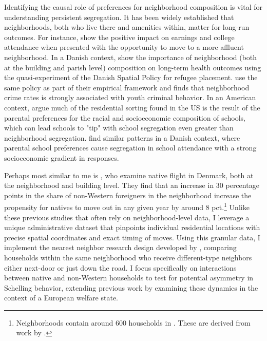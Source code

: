 \documentclass[../main.tex]{subfiles}
\begin{document}
Identifying the causal role of preferences for neighborhood composition is vital for understanding persistent segregation. It has been widely established that neighborhoods, both who live there and amenities within, matter for long-run outcomes. For instance, \textcite{chetty2016effects} show the positive impact on earnings and college attendance when presented with the opportunity to move to a more affluent neighborhood. In a Danish context, \textcite{hasager2024sick_poor_neighborhood} show the importance of neighborhood (both at the building and parish level) composition on long-term health outcomes using the quasi-experiment of the Danish Spatial Policy for refugee placement. \textcite{damm2014crime} use the same policy as part of their empirical framework and finds that neighborhood crime rates is strongly associated with youth criminal behavior. In an American context, \textcite{caetano2017school} argue much of the residential sorting found in the US is the result of the parental preferences for the racial and socioeconomic composition of schools, which can lead schools to "tip" with school segregation even greater than neighborhood segregation. \textcite{andreas_gandil_2024attendance_school_segregation} find similar patterns in a Danish context, where parental school preferences cause segregation in school attendance with a strong socioeconomic gradient in responses. 

Perhaps most similar to me is \textcite{rockwool_boje2024immigrants}, who examine native flight in Denmark, both at the neighborhood and building level. They find that an increase in 30 percentage points in the share of non-Western foreigners in the neighborhood increase the propensity for natives to move out in any given year by around 8 pct.\footnote{Neighborhoods contain around 600 households in \textcite{rockwool_boje2024immigrants}. These are derived from work by \textcite{damm2008danish}.} Unlike these previous studies that often rely on neighborhood-level data, I leverage a unique administrative dataset that pinpoints individual residential locations with precise spatial coordinates and exact timing of moves. Using this granular data, I implement the nearest neighbor research design developed by \textcite{Bayer_2022_nearest_neighbor}, comparing households within the same neighborhood who receive different-type neighbors either next-door or just down the road. I focus specifically on interactions between native and non-Western households to test for potential asymmetry in Schelling behavior, extending previous work by examining these dynamics in the context of a European welfare state.
\end{document}
